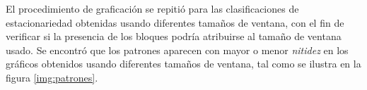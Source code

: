 El procedimiento de graficación se repitió para las clasificaciones de estacionariedad obtenidas usando diferentes tamaños de ventana, con el fin de verificar si la presencia de los bloques podría atribuirse al tamaño de ventana usado.
%
Se encontró que los patrones aparecen con mayor o menor \textit{nitidez} en los gráficos obtenidos usando diferentes tamaños de ventana, tal como se ilustra en la figura \ref{img:patrones}.






